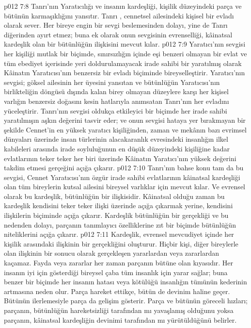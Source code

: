 \vs p012 7:8 Tanrı'nın Yaratıcılığı ve insanın kardeşliği, kişilik düzeyindeki parça ve bütünün karmaşıklığını yansıtır. Tanrı , cennetsel ailesindeki kişisel bir evladı olarak sever. Her bireye engin bir sevgi beslemesinden dolayı, yine de Tanrı  diğerinden ayırt etmez; buna ek olarak onun sevgisinin evrenselliği, kâinatsal kardeşlik olan bir bütünlüğün ilişkisini mevcut kılar.
\vs p012 7:9 Yaratıcı’nın sevgisi her kişiliği mutlak bir biçimde, sınırsızlığın içinde eşi benzeri olmayan bir evlat ve tüm ebediyet içerisinde yeri doldurulamayacak irade sahibi bir yaratılmış olarak Kâinatın Yaratıcısı’nın benzersiz bir evladı biçiminde bireyselleştirir. Yaratıcı’nın sevgisi; göksel ailesinin her üyesini yansıtan ve bütünlüğün Yaratıcısı’nın birlikteliğin döngüsü dışında kalan birey olmayan düzeylere karşı her kişisel varlığın benzersiz doğasını kesin hatlarıyla anımsatan Tanrı’nın her evladını yüceleştirir. Tanrı’nın sevgisi oldukça etkileyici bir biçimde her irade sahibi yaratılmışın aşkın değerini tasvir eder; ve onun sevgisi hataya yer bırakmayan bir şekilde Cennet’in en yüksek yaratıcı kişiliğinden, zaman ve mekânın bazı evrimsel dünyaları üzerinde insan türlerinin alacakaranlık evresindeki insanlığın ilkel kabileleri arasında irade soyluluğunun en düşük düzeyindeki kişiliğine kadar evlatlarının teker teker her biri üzerinde Kâinatın Yaratıcı’nın yüksek değerini takdim etmesi gerçeğini açığa çıkarır.
\vs p012 7:10 Tanrı’nın bahse konu tam da bu sevgisi, Cennet Yaratıcısı’nın özgür irade sahibi evlatlarının kâinatsal kardeşliği olan tüm bireylerin kutsal ailesini bireysel varlıklar için mevcut kılar. Ve evrensel olarak bu kardeşlik, bütünlüğün bir ilişkisidir. Kâinatsal olduğu zaman bu kardeşlik kendisini teker teker  ilişki üzerinde açığa çıkarmak yerine, kendisini ilişkilerin  biçiminde açığa çıkarır. Kardeşlik bütünlüğün bir gerçekliği ve bu nedenden dolayı, parçanın tanımlayıcı özelliklerine zıt bir biçimde bütünlüğün niteliklerini açığa çıkarır.
\vs p012 7:11 Kardeşlik, evrensel mevcudiyet içinde her kişilik arasındaki ilişkinin bir gerçekliğini oluşturur. Hiçbir kişi, diğer bireylerle olan ilişkinin bir sonucu olarak gerçekleşen yararlardan veya zararlardan kaçamaz. Fayda veya zararlar her zaman parçanın bütüne olan kıyasıdır. Her insanın iyi için gösterdiği bireysel çaba tüm insanlık için yarar sağlar; buna benzer bir biçimde her insanın hatası veya kötülüğü insanlığın tümünün kederinin artmasına neden olur. Parça hareket ettikçe, bütün de devinim haline geçer. Bütünün ilerlemesiyle parça da gelişim gösterir. Parça ve bütünün göreceli hızları; parçanın, bütünlüğün hareketsizliği tarafından mı yavaşlamış olduğunu yoksa parçanın, kâinatsal kardeşliğin devinimi tarafından mı yürütüldüğünü belirler.

